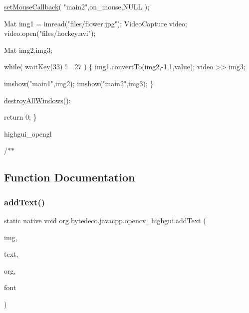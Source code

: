 \begin{DoxyPre}
\begin{DoxyCode}
    \hyperlink{group__highgui_gae53ffbc47967af79b35268d57575d6b4}{setMouseCallback}( \textcolor{stringliteral}{"main2"},on\_mouse,NULL );

    Mat img1 = imread(\textcolor{stringliteral}{"files/flower.jpg"});
    VideoCapture video;
    video.open(\textcolor{stringliteral}{"files/hockey.avi"});

    Mat img2,img3;

    \textcolor{keywordflow}{while}( \hyperlink{group__highgui_gaf924607bac022bb3603e459e3f2f3239}{waitKey}(33) != 27 )
    \{
        img1.convertTo(img2,-1,1,value);
        video >> img3;

        \hyperlink{group__highgui_gaf05d46739d8a87edb7405e79c7207975}{imshow}(\textcolor{stringliteral}{"main1"},img2);
        \hyperlink{group__highgui_gaf05d46739d8a87edb7405e79c7207975}{imshow}(\textcolor{stringliteral}{"main2"},img3);
    \}

    \hyperlink{group__highgui_gaff06efa4a5f234c304b6f498075abd1a}{destroyAllWindows}();

    \textcolor{keywordflow}{return} 0;
\}
\end{DoxyCode}
 \end{DoxyPre}
 

highgui\+\_\+opengl 

/$\ast$$\ast$ 

\subsection{Function Documentation}
\mbox{\label{group__highgui__qt_gaccc5f5d89abe18bc7adfd650dccb265f}} 
\subsubsection{\texorpdfstring{add\+Text()}{addText()}\hspace{0.1cm}{\footnotesize\ttfamily [1/2]}}
{\footnotesize\ttfamily static native void org.\+bytedeco.\+javacpp.\+opencv\+\_\+highgui.\+add\+Text (\begin{DoxyParamCaption}\item[{@Const @By\+Ref Mat}]{img,  }\item[{@Str Byte\+Pointer}]{text,  }\item[{@By\+Val fr.antproject.utils.Point}]{org,  }\item[{@Const @By\+Ref Qt\+Font}]{font }\end{DoxyParamCaption})\hspace{0.3cm}{\ttfamily [static]}}



